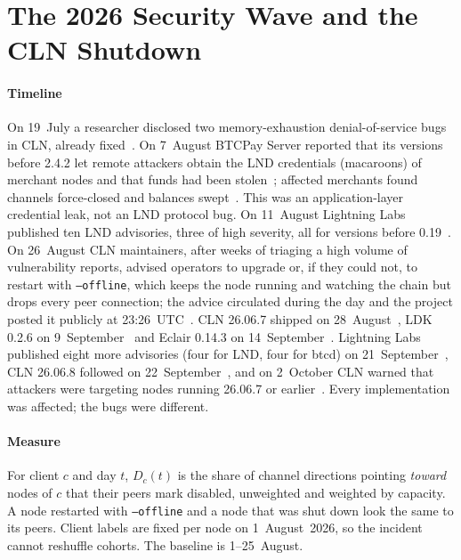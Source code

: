 \documentclass[conference]{IEEEtran}
\begin{document}


\section{The 2026 Security Wave and the CLN Shutdown}
\label{sec:outage}

\paragraph*{Timeline}
On 19~July a researcher disclosed two memory-exhaustion denial-of-service bugs in CLN, already
fixed~\cite{pratap2026clndos}. On 7~August BTCPay Server reported that its versions before 2.4.2 let remote
attackers obtain the LND credentials (macaroons) of merchant nodes and that funds had been
stolen~\cite{btcpay2026advisory}; affected merchants found channels force-closed and balances
swept~\cite{rubboli2026btcpay}. This was an application-layer credential leak, not an LND protocol bug. On
11~August Lightning Labs published ten LND advisories, three of high severity, all for versions before
0.19~\cite{lightninglabs2026aug}. On 26~August CLN maintainers, after weeks of triaging a high volume of
vulnerability reports, advised operators to upgrade or, if they could not, to restart with \texttt{--offline},
which keeps the node running and watching the chain but drops every peer connection; the advice circulated during
the day and the project posted it publicly at 23:26~UTC~\cite{snoffline2026,coreln2026offline}. CLN 26.06.7
shipped on 28~August~\cite{cln26067}, LDK 0.2.6 on 9~September~\cite{ldk026} and Eclair 0.14.3 on
14~September~\cite{eclair0143}. Lightning Labs published eight more advisories (four for LND, four for btcd) on
21~September~\cite{lightninglabs2026sep}, CLN 26.06.8 followed on 22~September~\cite{cln26068}, and on 2~October
CLN warned that attackers were targeting nodes running 26.06.7 or earlier~\cite{coreln2026attack}. Every
implementation was affected; the bugs were different.

\paragraph*{Measure}
For client $c$ and day $t$, $D_c(t)$ is the share of channel directions pointing \emph{toward} nodes of $c$ that
their peers mark disabled, unweighted and weighted by capacity. A node restarted with \texttt{--offline} and a node
that was shut down look the same to its peers. Client labels are fixed per node on 1~August~2026, so the incident
cannot reshuffle cohorts. The baseline is 1--25~August.
\end{document}
